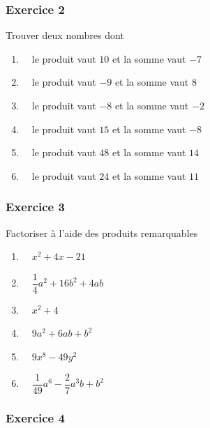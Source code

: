 \documentclass[
  12pt,
]{book}
\providecommand{\tightlist}{%
  \setlength{\itemsep}{0pt}\setlength{\parskip}{0pt}}
\begin{document}
\hypertarget{exercice-2-3}{%
\subsubsection*{Exercice 2}\label{exercice-2-3}}

Trouver deux nombres dont

\begin{enumerate}
\def\labelenumi{\arabic{enumi}.}
\tightlist
\item
  \(\quad\)le produit vaut \(10\) et la somme vaut \(-7\)
\item
  \(\quad\)le produit vaut \(-9\) et la somme vaut \(8\)
\item
  \(\quad\)le produit vaut \(-8\) et la somme vaut \(-2\)
\item
  \(\quad\)le produit vaut \(15\) et la somme vaut \(-8\)
\item
  \(\quad\)le produit vaut \(48\) et la somme vaut \(14\)
\item
  \(\quad\)le produit vaut \(24\) et la somme vaut \(11\)
\end{enumerate}

\hypertarget{exercice-3-4}{%
\subsubsection*{Exercice 3}\label{exercice-3-4}}

Factoriser à l'aide des produits remarquables

\begin{enumerate}
\def\labelenumi{\arabic{enumi}.}
\tightlist
\item
  \(\quad x^2+4x-21\)
\item
  \(\quad \dfrac{1}{4}a^2+16b^2+4ab\)
\item
  \(\quad x^2+4\)
\item
  \(\quad 9a^2+6ab+b^2\)
\item
  \(\quad 9x^8-49y^2\)
\item
  \(\quad \dfrac{1}{49}a^6-\dfrac{2}{7}a^3b+b^2\)
\end{enumerate}

\hypertarget{exercice-4-4}{%
\subsubsection*{Exercice 4}\label{exercice-4-4}}
\end{document}
